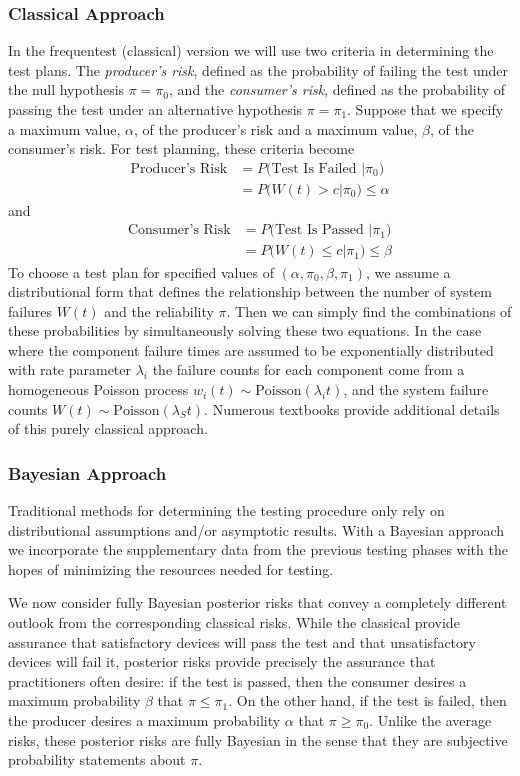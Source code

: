 \documentclass[12pt]{article}
\begin{document}
\subsubsection{Classical Approach}
In the frequentest (classical) version we will use two criteria in determining
the test plans. The \emph{producer's risk}, defined as the probability of
failing the test under the null hypothesis $\pi = \pi_0$, and the
\emph{consumer's risk}, defined as the probability of passing the test under an
alternative hypothesis $\pi = \pi_1$.  Suppose that we specify a maximum value,
$\alpha$, of the producer's risk and a maximum value, $\beta$, of the consumer's
risk. For test planning, these criteria become
$$
\begin{aligned}
	\text{Producer's Risk} &= P \text{(Test Is Failed } \vert \pi_0 \text{)} \\ &=
	P \text{(} W(t) > c \vert \pi_0 \text{)} \leq \alpha
\end{aligned}
$$
and
$$
\begin{aligned}
	\text{Consumer's Risk} &= P \text{(Test Is Passed } \vert \pi_1 \text{)} \\ &=
	P \text{(} W(t) \leq c \vert \pi_1 \text{)} \leq \beta
\end{aligned}
$$
To choose a test plan for specified values of $(\alpha, \pi_0, \beta, \pi_1)$,
we assume a distributional form that defines the relationship between the number
of system failures $W(t)$ and the reliability $\pi$.  Then we can simply find
the combinations of these probabilities by simultaneously solving these two
equations.  In the case where the component failure times are assumed to be
exponentially distributed with rate parameter $\lambda_i$ the failure counts for
each component come from a homogeneous Poisson process $w_i(t) \sim
\text{Poisson}(\lambda_i t)$, and the system failure counts $W(t) \sim
\text{Poisson}(\lambda_S t)$.  Numerous textbooks provide additional details of
this purely classical approach.

\subsubsection{Bayesian Approach}
Traditional methods for determining the testing procedure only rely on
distributional assumptions and/or asymptotic results. With a Bayesian approach we
incorporate the supplementary data from the previous testing phases with the
hopes of minimizing the resources needed for testing.

We now consider fully Bayesian posterior risks that convey a completely
different outlook from the corresponding classical risks. While the classical
provide assurance that satisfactory devices will pass the test and that
unsatisfactory devices will fail it, posterior risks provide precisely the
assurance that practitioners often desire: if the test is passed, then the
consumer desires a maximum probability $\beta$ that $\pi \leq \pi_1$. On the
other hand, if the test is failed, then the producer desires a maximum
probability $\alpha$ that $\pi \geq \pi_0$. Unlike the average risks, these
posterior risks are fully Bayesian in the sense that they are subjective
probability statements about $\pi$.
\end{document}

